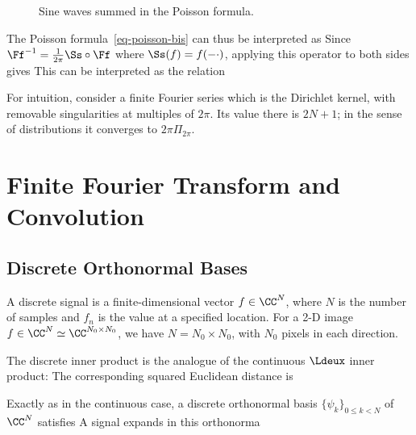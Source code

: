 \begin{figure}[tbp]
\centering
{}
\caption{Sine waves summed in the Poisson formula.}
\label{fig-review-fourier-poisson-distrib}
\end{figure}
The Poisson formula~\eqref{eq-poisson-bis} can thus be interpreted as
Since $\Ff^{-1} = \frac{1}{2\pi} \Ss \circ \Ff$ where $\Ss(f)=f(-\cdot)$, applying this operator to both sides gives
This can be interpreted as the relation

For intuition, consider a finite Fourier series
which is the Dirichlet kernel, with removable singularities at multiples of $2\pi$. Its value there is $2N+1$; in the sense of distributions it converges to $2\pi\Pi_{2\pi}$.

                                                
                                                
                                                
\section{Finite Fourier Transform and Convolution}
\label{sec-dft}

                                           
\subsection{Discrete Orthonormal Bases}

A discrete signal is a finite-dimensional vector $f \in \CC^N$, where $N$ is the number of samples and $f_n$ is the value at a specified location. For a 2-D image $f \in \CC^N \simeq \CC^{N_0 \times N_0}$, we have $N = N_0 \times N_0$, with $N_0$ pixels in each direction.

The discrete inner product is the analogue of the continuous $\Ldeux$ inner product:
The corresponding squared Euclidean distance is

Exactly as in the continuous case, a discrete orthonormal basis $\{ \psi_k \}_{0 \leq k < N }$ of $\CC^N$ satisfies
A signal expands in this orthonorma